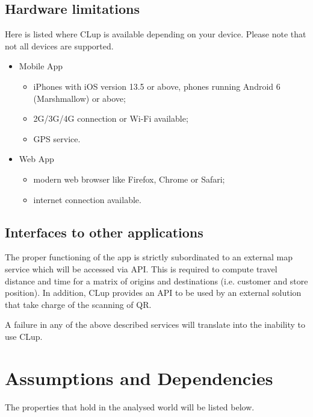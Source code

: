 \subsection{Hardware limitations}
 Here is listed where CLup is available depending on your device. Please note that not all devices are supported.
\begin{itemize}
	\item Mobile App
		\begin{itemize}
			\item iPhones with iOS version 13.5 or above, phones running Android 6 (Marshmallow) or above;
			\item 2G/3G/4G connection or Wi-Fi available;
			\item GPS service.
		\end{itemize}
	\item Web App
		\begin{itemize}
			\item modern web browser like Firefox, Chrome or Safari;
			\item internet connection available.
		\end{itemize}
\end{itemize}

\subsection{Interfaces to other applications}
The proper functioning of the app is strictly subordinated to an external map service which will be accessed via API. This is required to compute travel distance and time for a matrix of origins and destinations (i.e. customer and store position).\newline
In addition, CLup provides an API to be used by an external solution that take charge of the scanning of QR.

A failure in any of the above described services will translate into the inability to use CLup.

\clearpage

\section{Assumptions and Dependencies}
The properties that hold in the analysed world will be listed below.
